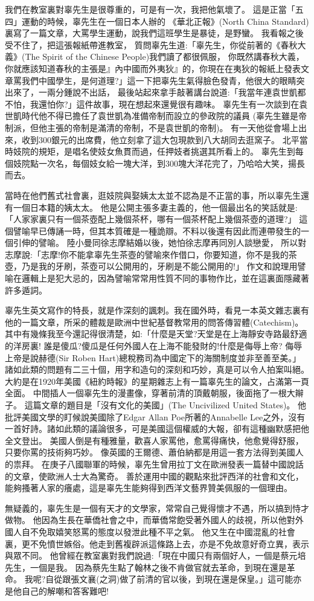 我們在教室裏對辜先生是很尊重的，可是有一次，我把他氣壞了。
這是正當「五四」運動的時候，辜先生在一個日本人辦的
《華北正報》(North China Standard)裏寫了一篇文章，大罵學生運動，說我們這班學生是暴徒，是野蠻。
我看報之後受不住了，把這張報紙帶進教室，
質問辜先生道:「辜先生，你從前著的《春秋大義》(The Spirit of the Chinese People)我們讀了都很佩服，
你既然講春秋大義，你就應該知道春秋的主張是』內中國而外夷狄』的，你現在在夷狄的報紙上發表文章罵我們中國學生，是何道理?」這一下把辜先生氣得臉色發青，他很大的眼睛突出來了，一兩分鍾說不出話，
最後站起來拿手敲著講台說道:「我當年連袁世凱都不怕，我還怕你?」這件故事，現在想起來還覺很有趣味。
辜先生有一次談到在袁世凱時代他不得已擔任了袁世凱為准備帝制而設立的參政院的議員
(辜先生雖是帝制派，但他主張的帝制是滿清的帝制，不是袁世凱的帝制)。
有一天他從會場上出來，收到300銀元的出席費，他立刻拿了這大包現款到八大胡同去逛窯子。
北平當時妓院的規矩，是唱名使妓女魚貫而過，任押妓者挑選其所看上的。
辜先生到每個妓院點一次名，每個妓女給一塊大洋，到300塊大洋花完了，乃哈哈大笑，揚長而去。

當時在他們舊式社會裏，逛妓院與娶姨太太並不認為是不正當的事，所以辜先生還有一個日本籍的姨太太。
他是公開主張多妻主義的，他一個最出名的笑話就是:「人家家裏只有一個茶壺配上幾個茶杯，哪有一個茶杯配上幾個茶壺的道理?」
這個譬喻早已傳誦一時，但其本質確是一種詭辯。不料以後還有因此而連帶發生的一個引伸的譬喻。
陸小曼同徐志摩結婚以後，她怕徐志摩再同別人談戀愛，
所以對志摩說:「志摩!你不能拿辜先生茶壺的譬喻來作借口，你要知道，你不是我的茶壺，乃是我的牙刷，茶壺可以公開用的，牙刷是不能公開用的!」
作文和說理用譬喻在邏輯上是犯大忌的，因為譬喻常常用性質不同的事物作比，並在這裏面隱藏著許多遁詞。

辜先生英文寫作的特長，就是作深刻的諷刺。我在國外時，看見一本英文雜志裏有他的一篇文章，所采的體裁是歐洲中世紀基督教常用的問答傳習體(Catechism)。
其中有幾條我至今還記得很清楚，如:「什麼是天堂?天堂是在上海靜安寺路最舒適的洋房裏!
誰是傻瓜?傻瓜是任何外國人在上海不能發財的!什麼是侮辱上帝?
侮辱上帝是說赫德(Sir Roben Hart)總稅務司為中國定下的海關制度並非至善至美。」
諸如此類的問題有二三十個，用字和造句的深刻和巧妙，真是可以令人拍案叫絕。
大約是在1920年美國《紐約時報》的星期雜志上有一篇辜先生的論文，占滿第一頁全面。
中間插人一個辜先生的漫畫像，穿著前清的頂戴朝服，後面拖了一根大辮子。
這篇文章的題目是「沒有文化的美國」(The Uncivilized United States)。
他批評美國文學的盯候說美國除了Edgar Allan Poe所著的Annabelle Lee之外，沒有一首好詩。諸如此類的議論很多，可是美國這個權威的大報，卻有這種幽默感把他全文登出。
美國人倒是有種雅量，歡喜人家罵他，愈罵得痛快，他愈覺得舒服，只要你罵的技術夠巧妙。
像英國的王爾德、蕭伯納都是用這一套方法得到美國人的祟拜。
在庚子八國聯軍的時候，辜先生曾用拉丁文在歐洲發表一篇替中國說話的文章，使歐洲人士大為驚奇。
善於運用中國的觀點來批評西洋的社會和文化，能夠搔著人家的癢處，這是辜先生能夠得到西洋文藝界贊美佩服的一個理由。

無疑義的，辜先生是一個有天才的文學家，常常自己覺得懷才不遇，所以搞到恃才做物。
他因為生長在華僑社會之中，而華僑常飽受著外國人的歧視，所以他對外國人自不免取嬉笑怒罵的態度以發泄此種不平之氣。
他又生在中國混亂的社會裏，更不免憤世嫉俗。他走到舊複辟派這條路上去，亦是不免故意好奇立異，表示與眾不同。
他曾經在教室裏對我們說過:「現在中國只有兩個好人，一個是蔡元培先生，一個是我。
因為蔡先生點了翰林之後不肯做官就去革命，到現在還是革命。
我呢?自從跟張文襄(之洞)做了前清的官以後，到現在還是保皇。」這可能亦是他自己的解嘲和答客難吧!


